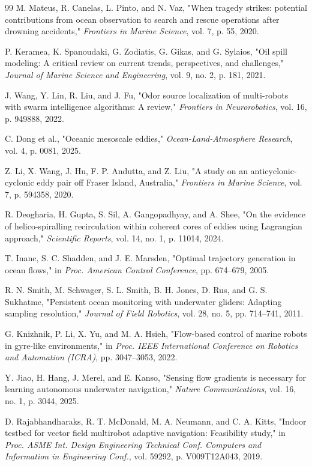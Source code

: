 \documentclass[lettersize,journal]{IEEEtran}
\begin{document}
\begin{thebibliography}{99}
 M. Mateus, R. Canelas, L. Pinto, and N. Vaz, "When tragedy strikes: potential contributions from ocean observation to search and rescue operations after drowning accidents," \textit{Frontiers in Marine Science}, vol. 7, p. 55, 2020.

 P. Keramea, K. Spanoudaki, G. Zodiatis, G. Gikas, and G. Sylaios, "Oil spill modeling: A critical review on current trends, perspectives, and challenges," \textit{Journal of Marine Science and Engineering}, vol. 9, no. 2, p. 181, 2021.

 J. Wang, Y. Lin, R. Liu, and J. Fu, "Odor source localization of multi-robots with swarm intelligence algorithms: A review," \textit{Frontiers in Neurorobotics}, vol. 16, p. 949888, 2022.

 C. Dong et al., "Oceanic mesoscale eddies," \textit{Ocean-Land-Atmosphere Research}, vol. 4, p. 0081, 2025.

 Z. Li, X. Wang, J. Hu, F. P. Andutta, and Z. Liu, "A study on an anticyclonic-cyclonic eddy pair off Fraser Island, Australia," \textit{Frontiers in Marine Science}, vol. 7, p. 594358, 2020.

 R. Deogharia, H. Gupta, S. Sil, A. Gangopadhyay, and A. Shee, "On the evidence of helico-spiralling recirculation within coherent cores of eddies using Lagrangian approach," \textit{Scientific Reports}, vol. 14, no. 1, p. 11014, 2024.

 T. Inanc, S. C. Shadden, and J. E. Marsden, "Optimal trajectory generation in ocean flows," in \textit{Proc. American Control Conference}, pp. 674--679, 2005.

 R. N. Smith, M. Schwager, S. L. Smith, B. H. Jones, D. Rus, and G. S. Sukhatme, "Persistent ocean monitoring with underwater gliders: Adapting sampling resolution," \textit{Journal of Field Robotics}, vol. 28, no. 5, pp. 714--741, 2011.

 G. Knizhnik, P. Li, X. Yu, and M. A. Hsieh, "Flow-based control of marine robots in gyre-like environments," in \textit{Proc. IEEE International Conference on Robotics and Automation (ICRA)}, pp. 3047--3053, 2022.

 Y. Jiao, H. Hang, J. Merel, and E. Kanso, "Sensing flow gradients is necessary for learning autonomous underwater navigation," \textit{Nature Communications}, vol. 16, no. 1, p. 3044, 2025.

 D. Rajabhandharaks, R. T. McDonald, M. A. Neumann, and C. A. Kitts, "Indoor testbed for vector field multirobot adaptive navigation: Feasibility study," in \textit{Proc. ASME Int. Design Engineering Technical Conf. Computers and Information in Engineering Conf.}, vol. 59292, p. V009T12A043, 2019.


\end{thebibliography}
\end{document}
